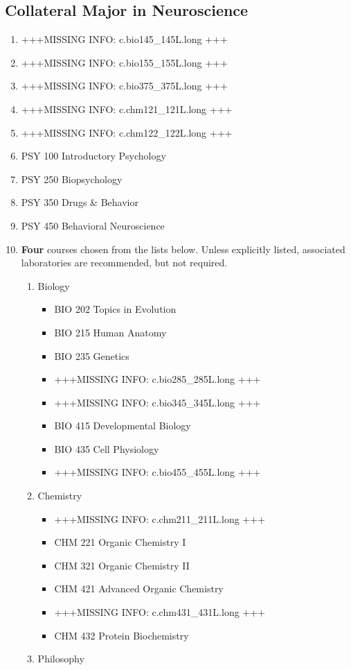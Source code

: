 \documentclass[
  letterpaper,
]{scrbook}
\providecommand{\tightlist}{%
  \setlength{\itemsep}{0pt}\setlength{\parskip}{0pt}}
\begin{document}
\subsection{Collateral Major in
Neuroscience}\label{collateral-major-in-neuroscience}

\begin{enumerate}
\def\labelenumi{\arabic{enumi}.}
\tightlist
\item
  +++MISSING INFO: c.bio145\_145L.long +++
\item
  +++MISSING INFO: c.bio155\_155L.long +++
\item
  +++MISSING INFO: c.bio375\_375L.long +++
\item
  +++MISSING INFO: c.chm121\_121L.long +++
\item
  +++MISSING INFO: c.chm122\_122L.long +++
\item
  PSY 100 Introductory Psychology
\item
  PSY 250 Biopsychology
\item
  PSY 350 Drugs \& Behavior
\item
  PSY 450 Behavioral Neuroscience
\item
  \textbf{Four} courses chosen from the lists below. Unless explicitly
  listed, associated laboratories are recommended, but not required.

  \begin{enumerate}
  \def\labelenumii{\alph{enumii}.}
  \tightlist
  \item
    Biology

    \begin{itemize}
    \tightlist
    \item
      BIO 202 Topics in Evolution
    \item
      BIO 215 Human Anatomy
    \item
      BIO 235 Genetics
    \item
      +++MISSING INFO: c.bio285\_285L.long +++
    \item
      +++MISSING INFO: c.bio345\_345L.long +++
    \item
      BIO 415 Developmental Biology
    \item
      BIO 435 Cell Physiology
    \item
      +++MISSING INFO: c.bio455\_455L.long +++
    \end{itemize}
  \item
    Chemistry

    \begin{itemize}
    \tightlist
    \item
      +++MISSING INFO: c.chm211\_211L.long +++
    \item
      CHM 221 Organic Chemistry I
    \item
      CHM 321 Organic Chemistry II
    \item
      CHM 421 Advanced Organic Chemistry
    \item
      +++MISSING INFO: c.chm431\_431L.long +++
    \item
      CHM 432 Protein Biochemistry
    \end{itemize}
  \item
    Philosophy


\end{enumerate}
\end{enumerate}
\end{document}
